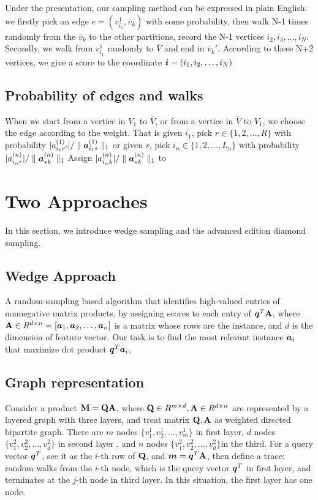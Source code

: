 \documentclass{article}
\newcommand{\Sca}[3]{{#1}^{(#2)}_{i_#2#3}}%
\newcommand{\V}[1]{{\bm{{\MakeLowercase{#1}}}}}%
\newcommand{\Varow}[1]{\V{a}^{(#1)}_{i_#1*}}
\newcommand{\Vacol}[1]{\V{a}^{(#1)}_{*k}}
\newcommand{\M}[1]{{\bm{\mathbf{\MakeUppercase{#1}}}}}%
\newcommand{\norm}[2]{\parallel#1\parallel_{#2}}
\begin{document}
Under the presentation, our sampling method can be expressed in plain English: we firstly pick an edge $e=(v^1_{i_1},\overline{v}_k)$ with some probability, then walk N-1 times randomly from the $\overline{v}_k$ to the other partitions, record the N-1 vertices $i_2,i_3,\ldots,i_N$. Secondly, we walk from $v^1_{i_1}$ randomly to $\overline{V}$ and end in $\overline{v}_k'$. According to these N+2 vertices, we give a score to the coordinate $\V{i}=(i_1,i_2,\ldots,i_N)$

\subsection{Probability of edges and walks}

When we start from a vertice in $V_1$ to $\overline{V}$, or from a vertice in $\overline{V}$ to $V_1$, we choose the edge according to the weight. That is given $i_1$, pick $r\in\{1,2,\ldots,R\}$ with probability $|\Sca{a}{1}{r'}|/\norm{\Varow{1}}{1}$ or given $r$, pick $i_n\in\{1,2,\ldots,L_n\}$ with probability $|\Sca{a}{n}{r}|/\norm{\Vacol{n}}{1}$
Assign $|\Sca{a}{n}{k}|/\norm{\Vacol{n}}{1}$ to 
\section{Two Approaches}
In this section, we introduce wedge sampling and the advanced edition diamond sampling.
\subsection{Wedge Approach}
A random-sampling based algorithm that identifies high-valued entries of nonnegative matrix products, by assigning scores to each entry of $\V{q}^T\M{A}$, where $\M{A}\in R^{d\times n}=[\V{a}_1,\V{a}_2,\ldots,\V{a}_n]$ is a matrix whose rows are the instance, and $d$ is the dimension of feature vector. Our task is to find the most relevant instance $\V{a}_i$ that maximize dot product $\V{q}^T\V{a}_i$,
\subsection{Graph representation}

Consider a product $\M{m} = \M{q}\M{A}$, where $\M{q}\in R^{m\times d},\M{A}\in R^{d\times n}$ are represented by a layered graph with three layers, and treat matrix $\M{q},\M{A}$ as weighted directed bipartite graph. There are $m$ nodes $\{v_1^1,v_2^1,\ldots,v_m^1\}$ in first layer, $d$ nodes $\{v_1^2,v_2^2,\ldots,v_d^2\}$ in second layer  , and $n$ nodes $\{v_1^2,v_2^2,\ldots,v_d^2\}$in the third. For a query vector $\V{q}^T$, see it as the $i$-th row of $\M{Q}$, and $\V{m} = \V{q}^T\M{A}$, then define a trace: random walks from the $i$-th node, which is the query vector $\V{q}^T$ in first layer, and terminates at the $j$-th node in third layer. In this situation, the first layer has one node.
\end{document}
